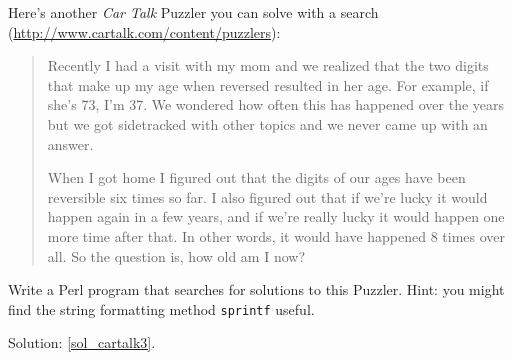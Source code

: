 \begin{exercise}
Here's another {\em Car Talk} Puzzler you can solve with a
search (\url{http://www.cartalk.com/content/puzzlers}):
\label{cartalk3}

\begin{quote}
Recently I had a visit with my mom and we realized that
the two digits that make up my age when reversed resulted in her
age. For example, if she's 73, I'm 37. We wondered how often this has
happened over the years but we got sidetracked with other topics and
we never came up with an answer.

When I got home I figured out that the digits of our ages have been
reversible six times so far. I also figured out that if we're lucky it
would happen again in a few years, and if we're really lucky it would
happen one more time after that. In other words, it would have
happened 8 times over all. So the question is, how old am I now?

\end{quote}

Write a Perl program that searches for solutions to this Puzzler.
Hint: you might find the string formatting method 
{\tt sprintf} useful.

Solution: \ref{sol_cartalk3}.

\end{exercise}
